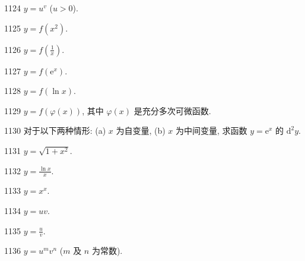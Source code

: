 \begin{prob}[S]{1124}
$y = u^v$ ($u > 0$).
\end{prob}


\begin{prob}[S]{1125}
$y = f(x^2)$.
\end{prob}

\begin{prob}[S]{1126}
$y = f\left(\frac{1}{x}\right)$.
\end{prob}

\begin{prob}[S]{1127}
$y = f(\mathrm{e}^x)$.
\end{prob}

\begin{prob}[S]{1128}
$y = f(\ln x)$.
\end{prob}

\begin{prob}[S]{1129}
$y = f(\varphi(x))$, 其中 $\varphi(x)$ 是充分多次可微函数.
\end{prob}

\begin{prob}[M]{1130}
对于以下两种情形: (a) $x$ 为自变量, (b) $x$ 为中间变量, 求函数 $y = \mathrm{e}^x$ 的 $\mathrm{d}^2 y$.
\end{prob}


\begin{prob}[S]{1131}
$y = \sqrt{1 + x^2}$.
\end{prob}

\begin{prob}[S]{1132}
$y = \frac{\ln x}{x}$.
\end{prob}

\begin{prob}[S]{1133}
$y = x^x$.
\end{prob}


\begin{prob}[S]{1134}
$y = uv$.
\end{prob}

\begin{prob}[S]{1135}
$y = \frac{u}{v}$.
\end{prob}

\begin{prob}[S]{1136}
$y = u^m v^n$ ($m$ 及 $n$ 为常数).
\end{prob}

